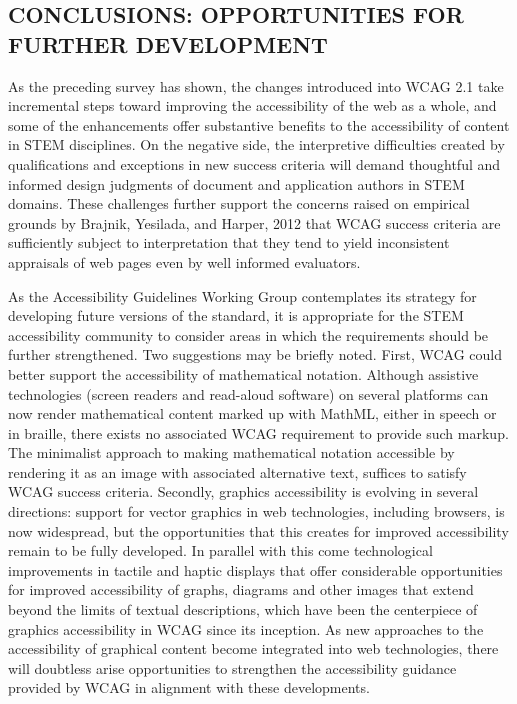 \documentclass[11.5pt]{sig-alternate} %
\begin{document}
\begin{large}
\section*{CONCLUSIONS: OPPORTUNITIES FOR FURTHER DEVELOPMENT}

As the preceding survey has shown, the changes introduced into WCAG 2.1 take incremental steps toward improving the accessibility of the web as a whole, and some of the enhancements offer substantive benefits to the accessibility of content in STEM disciplines. On the negative side, the interpretive difficulties created by qualifications and exceptions in new success criteria will demand thoughtful and informed design judgments of document and application authors in STEM domains. These challenges further support the concerns raised on empirical grounds by Brajnik, Yesilada, and Harper, 2012 that WCAG success criteria are sufficiently subject to interpretation that they tend to yield inconsistent appraisals of web pages even by well informed evaluators.

As the Accessibility Guidelines Working Group contemplates its strategy for developing future versions of the standard, it is appropriate for the STEM accessibility community to consider areas in which the requirements should be further strengthened. Two suggestions may be briefly noted. First, WCAG could better support the accessibility of mathematical notation. Although assistive technologies (screen readers and read-aloud software) on several platforms can now render mathematical content marked up with MathML, either in speech or in braille, there exists no associated WCAG requirement to provide such markup. The minimalist approach to making mathematical notation accessible by rendering it as an image with associated alternative text, suffices to satisfy WCAG success criteria. Secondly, graphics accessibility is evolving in several directions: support for vector graphics in web technologies, including browsers, is now widespread, but the opportunities that this creates for improved accessibility remain to be fully developed. In parallel with this come technological improvements in tactile and haptic displays that offer considerable opportunities for improved accessibility of graphs, diagrams and other images that extend beyond the limits of textual descriptions, which have been the centerpiece of graphics accessibility in WCAG since its inception. As new approaches to the accessibility of graphical content become integrated into web technologies, there will doubtless arise opportunities to strengthen the accessibility guidance provided by WCAG in alignment with these developments.

\end{large}
\clearpage 
\end{document}
